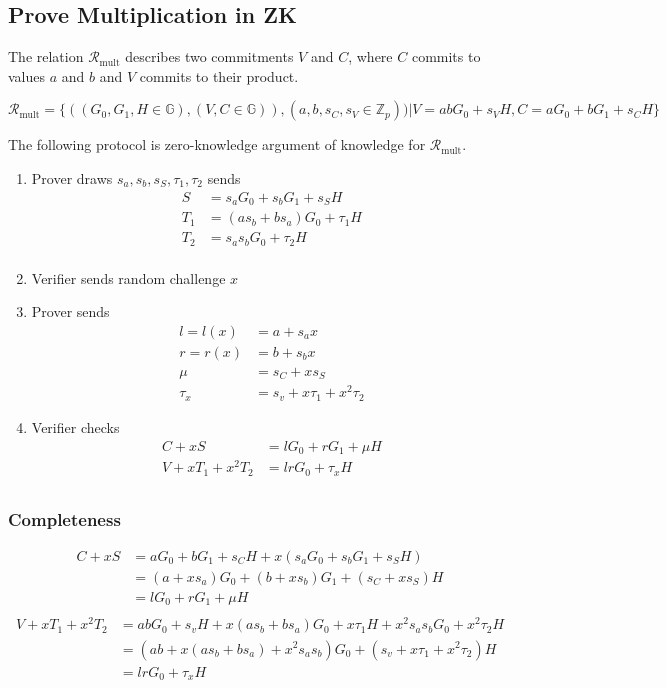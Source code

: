 \subsection{Prove Multiplication in ZK}

The relation $\mathcal{R}_{\textrm{mult}}$ describes two commitments $V$ and $C$, where $C$ commits to values $a$ and $b$ and $V$ commits to their product.

\begin{equation*}
  \mathcal{R}_{\textrm{mult}} = \{ ((G_0, G_1, H \in \mathbb{G}), (V, C \in \mathbb{G})) , (a, b, s_C, s_V \in \mathbb{Z}_p))  | V = abG_0 + s_VH, C = aG_0 + bG_1 + s_CH\}
\end{equation*}

The following protocol is zero-knowledge argument of knowledge for $\mathcal{R}_{\textrm{mult}}$.

\begin{enumerate}
\item Prover draws $s_a, s_b, s_S, \tau_1, \tau_2$ sends
  \begin{align*}
    S &= s_aG_0 + s_b G_1 + s_S H\\
    T_1 &= (as_b + bs_a)G_0 + \tau_1H\\
    T_2 &= s_as_bG_0 + \tau_2H\\
  \end{align*}
  \item Verifier sends random challenge $x$
  \item Prover sends
  \begin{align*}
    l = l(x) &= a + s_ax\\
    r = r(x) &= b + s_bx\\
    \mu &= s_C + xs_S\\
    \tau_x &= s_v + x\tau_1 + x^2\tau_2
  \end{align*}
  \item Verifier checks
    \begin{align*}
      C + xS &= lG_0 + rG_1 + \mu H\\
      V + xT_1 + x^2T_2 &= lrG_0 + \tau_x H \\
    \end{align*}
\end{enumerate}

\subsubsection{Completeness}
\begin{align*}
  C + xS &= aG_0 + bG_1 + s_CH + x(s_aG_0 + s_b G_1 + s_SH)\\
         &= (a + xs_a)G_0 + (b + xs_b)G_1 + (s_C + xs_S)H\\
         &= lG_0 + rG_1 + \mu H\\
\end{align*}
\begin{align*}
  V + xT_1 + x^2T_2 &= abG_0 + s_vH+ x(as_b + bs_a)G_0 + x\tau_1H + x^2s_as_bG_0 + x^2\tau_2H\\
                    &= (ab + x(as_b + bs_a) + x^2s_as_b)G_0 + (s_v + x\tau_1 + x^2\tau_2)H\\
                    &= lrG_0 + \tau_xH
\end{align*}


